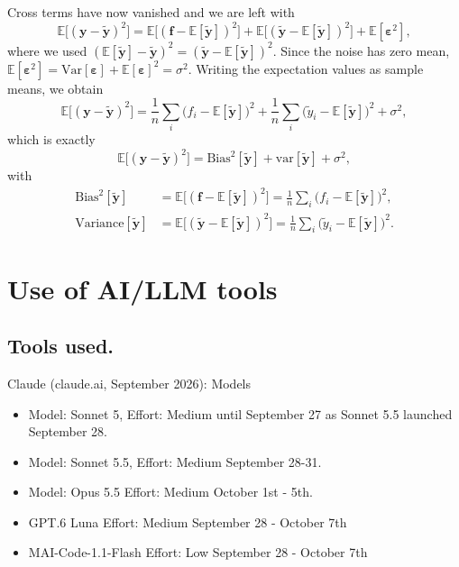 \documentclass[reprint,english,notitlepage]{revtex4-2}  %
\begin{document}
Cross terms have now vanished and we are left with
\begin{equation*}
\mathbb{E}\big[(\mathbf{y} - \tilde{\mathbf{y}})^2\big]
= \mathbb{E}\big[(\mathbf{f} - \mathbb{E}[\tilde{\mathbf{y}}])^2\big]
+ \mathbb{E}\big[(\tilde{\mathbf{y}} - \mathbb{E}[\tilde{\mathbf{y}}])^2\big]
+ \mathbb{E}[\boldsymbol{\varepsilon}^2] ,
\end{equation*}
where we used $(\mathbb{E}[\tilde{\mathbf{y}}] - \tilde{\mathbf{y}})^2
= (\tilde{\mathbf{y}} - \mathbb{E}[\tilde{\mathbf{y}}])^2$. Since the noise has
zero mean, $\mathbb{E}[\boldsymbol{\varepsilon}^2]
= \mathrm{Var}[\boldsymbol{\varepsilon}] + \mathbb{E}[\boldsymbol{\varepsilon}]^2 = \sigma^2$.
Writing the expectation values as sample means, we obtain
\begin{equation*}
\mathbb{E}\big[(\mathbf{y} - \tilde{\mathbf{y}})^2\big]
= \frac{1}{n}\sum_i \big(f_i - \mathbb{E}[\tilde{\mathbf{y}}]\big)^2
+ \frac{1}{n}\sum_i \big(\tilde{y}_i - \mathbb{E}[\tilde{\mathbf{y}}]\big)^2
+ \sigma^2 ,
\end{equation*}
which is exactly
\begin{equation*}
\mathbb{E}\big[(\mathbf{y} - \tilde{\mathbf{y}})^2\big]
= \mathrm{Bias}^2[\tilde{\mathbf{y}}] + \mathrm{var}[\tilde{\mathbf{y}}] + \sigma^2 ,
\end{equation*}
with
\begin{align*}
\mathrm{Bias}^2[\tilde{\mathbf{y}}]
&= \mathbb{E}\big[(\mathbf{f} - \mathbb{E}[\tilde{\mathbf{y}}])^2\big]
= \frac{1}{n}\sum_i \big(f_i - \mathbb{E}[\tilde{\mathbf{y}}]\big)^2 , \\
\mathrm{Variance}[\tilde{\mathbf{y}}]
&= \mathbb{E}\big[(\tilde{\mathbf{y}} - \mathbb{E}[\tilde{\mathbf{y}}])^2\big]
= \frac{1}{n}\sum_i \big(\tilde{y}_i - \mathbb{E}[\tilde{\mathbf{y}}]\big)^2 .
\end{align*}



\section{Use of AI/LLM tools} \label{app:LLM}

\subsection{\textbf{Tools used}.} Claude (claude.ai, September 2026):
Models
\begin{itemize}
    \item  Model: Sonnet 5, Effort: Medium until September 27 as Sonnet 5.5 launched September 28.
    \item Model: Sonnet 5.5, Effort: Medium September 28-31.
    \item Model: Opus 5.5 Effort: Medium  October 1st - 5th.
    \item GPT.6 Luna Effort: Medium September 28 - October 7th
    \item MAI-Code-1.1-Flash Effort: Low September 28 - October 7th
\end{itemize}
\end{document}
